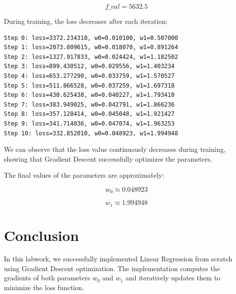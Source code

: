 \documentclass{article}
\begin{document}
\[
f\_val = 5632.5
\]

During training, the loss decreases after each iteration:

\begin{verbatim}
Step 0: loss=3372.234310, w0=0.010100, w1=0.507000
Step 1: loss=2073.809615, w0=0.018070, w1=0.891264
Step 2: loss=1327.917833, w0=0.024424, w1=1.182502
Step 3: loss=899.430512, w0=0.029556, w1=1.403234
Step 4: loss=653.277290, w0=0.033759, w1=1.570527
Step 5: loss=511.866528, w0=0.037259, w1=1.697318
Step 6: loss=430.625438, w0=0.040227, w1=1.793410
Step 7: loss=383.949025, w0=0.042791, w1=1.866236
Step 8: loss=357.128414, w0=0.045048, w1=1.921427
Step 9: loss=341.714036, w0=0.047074, w1=1.963253
Step 10: loss=332.852010, w0=0.048923, w1=1.994948
\end{verbatim}

We can observe that the loss value continuously decreases during training, showing that Gradient Descent successfully optimizes the parameters.

The final values of the parameters are approximately:

\[
w_0 \approx 0.048923
\]

\[
w_1 \approx 1.994948
\]

\section{Conclusion}

In this labwork, we successfully implemented Linear Regression from scratch using Gradient Descent optimization. The implementation computes the gradients of both parameters \(w_0\) and \(w_1\) and iteratively updates them to minimize the loss function.
\end{document}
